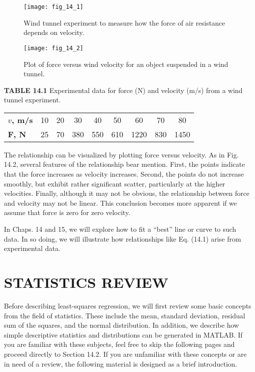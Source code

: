 \documentclass[../main.tex]{subfiles}
\begin{document}
\begin{figure}[H]
	\centering
	\texttt{[image: fig\_14\_1]}
	\caption{\textsf{Wind tunnel experiment to measure how the force of air resistance depends on velocity.}}
	\label{fig:fig_14_1}
\end{figure}

\begin{figure}[H]
	\centering
	\texttt{[image: fig\_14\_2]}
	\caption{\textsf{Plot of force versus wind velocity for an object suspended in a wind tunnel.}}
	\label{fig:fig_14_2}
\end{figure}

\noindent \textbf{TABLE 14.1} Experimental data for force (N) and velocity (m/s) from a wind tunnel
experiment.

\begin{tabular}{l c c c ccccc}
	\textbf{$v$, m/s} & 10 & 20 & 30 & 40 & 50 & 60 & 70 & 80 \\
	\textbf{F, N} & 25 & 70 & 380 & 550 & 610 & 1220 & 830 & 1450
\end{tabular}

The relationship can be visualized by plotting force versus velocity. As in Fig. 14.2,
several features of the relationship bear mention. First, the points indicate that the force
increases as velocity increases. Second, the points do not increase smoothly, but exhibit
rather significant scatter, particularly at the higher velocities. Finally, although it may not
be obvious, the relationship between force and velocity may not be linear. This conclusion
becomes more apparent if we assume that force is zero for zero velocity.

In Chaps. 14 and 15, we will explore how to fit a ``best'' line or curve to such data. In
so doing, we will illustrate how relationships like Eq. (14.1) arise from experimental data.


\label{cha:cha_P_14_1}
\section{STATISTICS REVIEW}

\noindent Before describing least-squares regression, we will first review some basic concepts
from the field of statistics. These include the mean, standard deviation, residual sum of
the squares, and the normal distribution. In addition, we describe how simple descriptive
statistics and distributions can be generated in MATLAB. If you are familiar with these
subjects, feel free to skip the following pages and proceed directly to Section 14.2. If you
are unfamiliar with these concepts or are in need of a review, the following material is
designed as a brief introduction.
\end{document}
